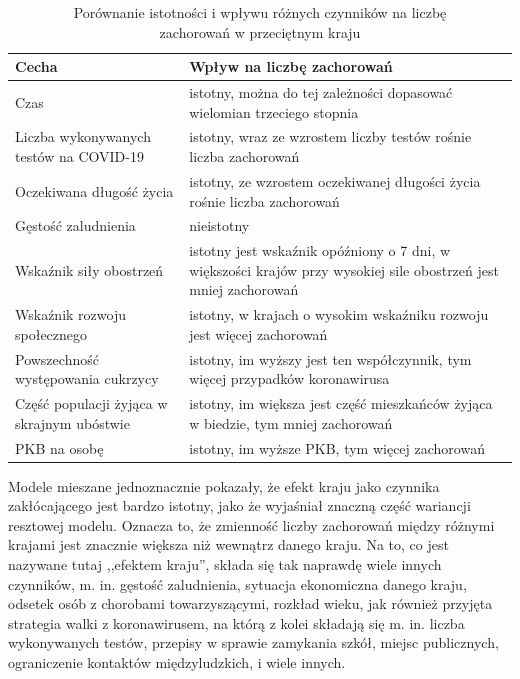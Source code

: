 \documentclass[12pt]{mwbk}
\theoremstyle{plain}
\theoremstyle{definition}
\theoremstyle{definition}
\newcommand\zrodlo[1]{\par\vspace{-3mm}{\small\textit{Źródło: }#1 }}
\begin{document}
\begin{longtable}{| p{} | p{} |}
	\caption{Porównanie istotności i wpływu różnych czynników na liczbę \\zachorowań w przeciętnym kraju\\ }
	\label{tab:istotnosc}
	\endfirsthead
	\endhead
	\hline
	Cecha & Wpływ na liczbę zachorowań \\ \hline \hline 
	Czas & istotny, można do tej zależności dopasować wielomian trzeciego stopnia \\ \hline
	Liczba wykonywanych testów na COVID-19 & istotny, wraz ze wzrostem liczby testów rośnie liczba zachorowań \\ \hline
	Oczekiwana długość życia & istotny, ze wzrostem oczekiwanej długości życia rośnie liczba zachorowań \\ \hline 
	Gęstość zaludnienia & nieistotny \\ \hline
	Wskaźnik siły obostrzeń & istotny jest wskaźnik opóźniony o 7 dni, w większości krajów przy wysokiej sile obostrzeń jest mniej zachorowań \\ \hline
	Wskaźnik rozwoju społecznego & istotny, w krajach o wysokim wskaźniku rozwoju jest więcej zachorowań \\ \hline
	Powszechność występowania cukrzycy & istotny, im wyższy jest ten współczynnik, tym więcej przypadków koronawirusa \\ \hline
	Część populacji żyjąca w skrajnym ubóstwie & istotny, im większa jest część mieszkańców żyjąca w biedzie, tym mniej zachorowań \\ \hline
	PKB na osobę & istotny, im wyższe PKB, tym więcej zachorowań \\ \hline
	
	
	
\end{longtable}
\begin{center}
\zrodlo{Opracowanie własne}
\end{center}

Modele mieszane jednoznacznie pokazały, że efekt kraju jako czynnika zakłócającego jest bardzo istotny, jako że wyjaśniał znaczną część wariancji resztowej modelu. Oznacza to, że zmienność liczby zachorowań między różnymi krajami jest znacznie większa niż wewnątrz danego kraju. Na to, co jest nazywane tutaj ,,efektem kraju'', składa się tak naprawdę wiele innych czynników, m. in. gęstość zaludnienia, sytuacja ekonomiczna danego kraju, odsetek osób z chorobami towarzyszącymi, rozkład wieku, jak również przyjęta strategia walki z koronawirusem, na którą z kolei składają się m. in. liczba wykonywanych testów, przepisy w sprawie zamykania szkół, miejsc publicznych, ograniczenie kontaktów międzyludzkich, i wiele innych.
\end{document}

